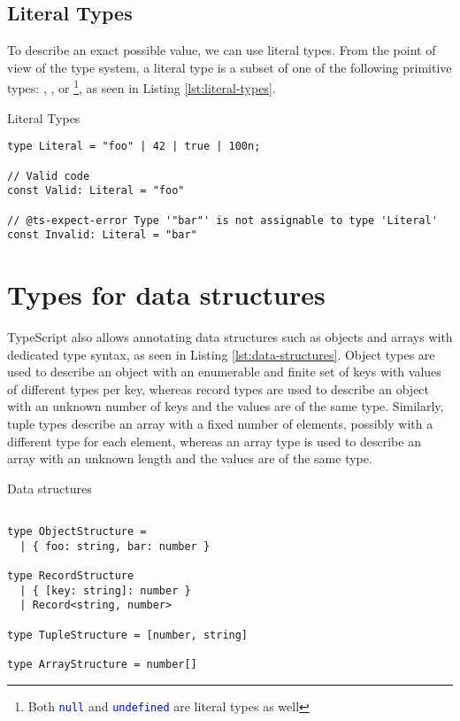 \subsection{Literal Types}

To describe an exact possible value, we can use literal types. From the point of view of the type system, a literal type is a subset of one of the following primitive types: , ,  or \footnote{Both \texttt{\textcolor{blue}{null}} and \texttt{\textcolor{blue}{undefined}} are literal types as well}, as seen in Listing \ref{lst:literal-types}.

\begin{listing}[h]
  \caption{Literal Types}\label{lst:literal-types}
  \begin{verbatim}
type Literal = "foo" | 42 | true | 100n;

// Valid code
const Valid: Literal = "foo"

// @ts-expect-error Type '"bar"' is not assignable to type 'Literal'
const Invalid: Literal = "bar" 
\end{verbatim}
\end{listing}

\section{Types for data structures}

TypeScript also allows annotating data structures such as objects and arrays with dedicated type syntax, as seen in Listing \ref{lst:data-structures}. Object types are used to describe an object with an enumerable and finite set of keys with values of different types per key, whereas record types are used to describe an object with an unknown number of keys and the values are of the same type. Similarly, tuple types describe an array with a fixed number of elements, possibly with a different type for each element, whereas an array type is used to describe an array with an unknown length and the values are of the same type.

\begin{listing}[h]
  \caption{Data structures}\label{lst:data-structures}
  \begin{verbatim}

type ObjectStructure =  
  | { foo: string, bar: number }

type RecordStructure 
  | { [key: string]: number }
  | Record<string, number>

type TupleStructure = [number, string]

type ArrayStructure = number[]
\end{verbatim}
\end{listing}

